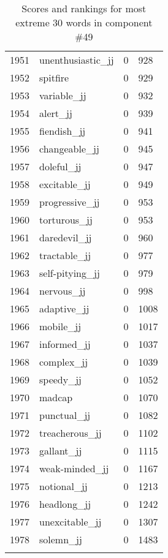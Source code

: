 \begin{longtable}[!htbp]{| rlr@{.}l |}
    1951 & unenthusiastic\_jj & 0 & 928 \\
    1952 & spitfire & 0 & 929 \\
    1953 & variable\_jj & 0 & 932 \\
    1954 & alert\_jj & 0 & 939 \\
    1955 & fiendish\_jj & 0 & 941 \\
    1956 & changeable\_jj & 0 & 945 \\
    1957 & doleful\_jj & 0 & 947 \\
    1958 & excitable\_jj & 0 & 949 \\
    1959 & progressive\_jj & 0 & 953 \\
    1960 & torturous\_jj & 0 & 953 \\
    1961 & daredevil\_jj & 0 & 960 \\
    1962 & tractable\_jj & 0 & 977 \\
    1963 & self-pitying\_jj & 0 & 979 \\
    1964 & nervous\_jj & 0 & 998 \\
    1965 & adaptive\_jj & 0 & 1008 \\
    1966 & mobile\_jj & 0 & 1017 \\
    1967 & informed\_jj & 0 & 1037 \\
    1968 & complex\_jj & 0 & 1039 \\
    1969 & speedy\_jj & 0 & 1052 \\
    1970 & madcap & 0 & 1070 \\
    1971 & punctual\_jj & 0 & 1082 \\
    1972 & treacherous\_jj & 0 & 1102 \\
    1973 & gallant\_jj & 0 & 1115 \\
    1974 & weak-minded\_jj & 0 & 1167 \\
    1975 & notional\_jj & 0 & 1213 \\
    1976 & headlong\_jj & 0 & 1242 \\
    1977 & unexcitable\_jj & 0 & 1307 \\
    1978 & solemn\_jj & 0 & 1483 \\
    \hline
    \caption{Scores and rankings for most extreme 30 words in component \#49} \\
\end{longtable}
